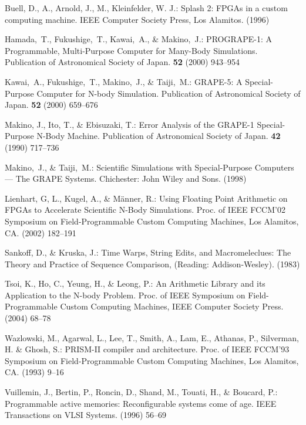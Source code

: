 \documentclass[times, 10pt,twocolumn]{article}
\begin{document}

\begin{thebibliography}{}

Buell, D., A., Arnold, J., M., Kleinfelder, W. J.:
Splash 2: FPGAs in a custom computing machine.
IEEE Computer Society Press, Los Alamitos.
(1996)

Hamada,~T., Fukushige,~T., Kawai,~A., \& Makino,~J.:
PROGRAPE-1: A Programmable, Multi-Purpose Computer for Many-Body Simulations.
Publication of Astronomical Society of Japan.
{\bfseries 52} (2000) 943--954

Kawai,~A., Fukushige,~T., Makino,~J., \& Taiji,~M.:
GRAPE-5: A Special-Purpose Computer for N-body Simulation.
Publication of Astronomical Society of Japan.
{\bfseries 52} (2000) 659--676

Makino, J., Ito, T., \& Ebisuzaki, T.:
Error Analysis of the GRAPE-1 Special-Purpose N-Body Machine.
Publication of Astronomical Society of Japan.
{\bfseries 42} (1990) 717--736

Makino,~J., \& Taiji,~M.:
Scientific Simulations with Special-Purpose Computers --- The GRAPE Systems.
Chichester: John Wiley and Sons.
(1998)

Lienhart, G, L., Kugel, A., \& M{\"a}nner, R.:
Using Floating Point Arithmetic on FPGAs to Accelerate Scientific N-Body Simulations.
Proc. of IEEE FCCM'02 Symposium on Field-Programmable Custom Computing Machines, 
Los Alamitos, CA.
(2002) 182--191

Sankoff, D., \& Kruska, J.:
Time Warps, String Edits, and Macromeleclues:
The Theory and Practice of Sequence Comparison, (Reading: Addison-Wesley).
(1983)

Tsoi, K., Ho, C., Yeung, H., \& Leong, P.:
An Arithmetic Library and its Application to the N-body Problem.
Proc. of IEEE Symposium on Field-Programmable Custom Computing Machines, 
IEEE Computer Society Press.
(2004) 68--78

Wazlowski, M., Agarwal, L., Lee, T., Smith, A., Lam, E., Athanas, P., Silverman, H. \& Ghosh, S.:
PRISM-II compiler and architecture. 
Proc. of IEEE FCCM'93 Symposium on Field-Programmable Custom Computing Machines, 
Los Alamitos, CA.
(1993) 9--16 

Vuillemin, J., Bertin, P., Roncin, D., Shand, M., Touati, H., \& Boucard, P.:
Programmable active memories: Reconfigurable systems come of age.
IEEE Transactions on VLSI Systems.
(1996) 56--69

\end{thebibliography}
\end{document}
